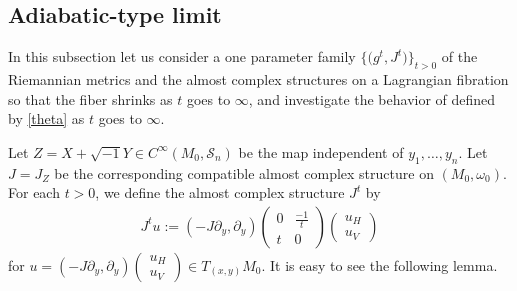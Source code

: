 \documentclass[10pt,a4paper]{amsart}
\numberwithin{equation}{section}
\begin{document}
\subsection{Adiabatic-type limit}\label{adiabatic limit}
In this subsection let us consider a one parameter family $\big\{\bigl(g^t, J^t\bigr)\big\}_{t>0}$ of the Riemannian metrics and the almost complex structures on a Lagrangian fibration so that the fiber shrinks as $t$ goes to $\infty$, and investigate the behavior of  defined by \eqref{theta} as $t$ goes to $\infty$.

Let $Z=X+\sqrt{-1}Y\in C^\infty ( M_0,{\mathcal S}_n)$ be the map independent of $y_1, \ldots ,y_n$. Let $J=J_Z$ be the corresponding compatible almost complex structure on $(M_0,\omega_0)$. For each $t>0$, we define the almost complex structure $J^t$ by
\begin{align*}
J^tu:=( -J\partial_y, \partial_y)
\begin{pmatrix}
0 & \frac{-1}{t}\\
t & 0
\end{pmatrix}
\begin{pmatrix}
u_H\\
u_V
\end{pmatrix}
\end{align*}
for $u=(-J\partial_y, \partial_y)
\left(\begin{smallmatrix}
u_H\\
u_V
\end{smallmatrix}\right)\in T_{(x,y)}M_0$. It is easy to see the following lemma.
\end{document}
